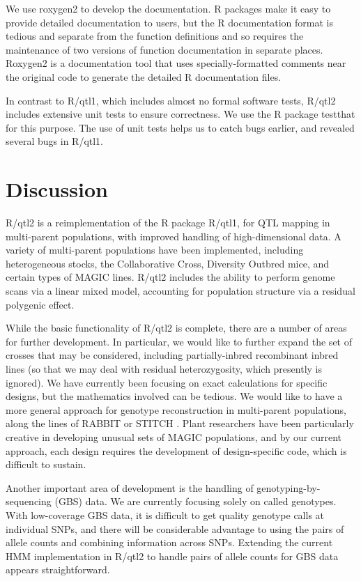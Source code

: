 \documentclass[12pt,letterpaper]{article}
\begin{document}
We use roxygen2 \citep{roxygen2} to develop the documentation. R
packages make it easy to provide detailed documentation to users, but
the R documentation format is tedious and separate from the function
definitions and so requires the maintenance of two versions of
function documentation in separate places. Roxygen2 is a documentation
tool that uses specially-formatted comments near the original code to
generate the detailed R documentation files.

In contrast to R/qtl1, which includes almost no formal software tests,
R/qtl2 includes extensive unit tests to ensure correctness. We use the
R package testthat \citep{testthat} for this purpose. The use of unit
tests helps us to catch bugs earlier, and revealed several bugs in
R/qtl1.




\clearpage
\section*{Discussion}

R/qtl2 is a reimplementation of the R package R/qtl1, for QTL mapping
in multi-parent populations, with improved handling of
high-dimensional data. A variety of multi-parent populations have been
implemented, including heterogeneous stocks, the Collaborative Cross,
Diversity Outbred mice, and certain types of MAGIC lines. R/qtl2
includes the ability to perform genome scans via a linear mixed model,
accounting for population structure via a residual polygenic effect.

While the basic functionality of R/qtl2 is complete, there are a
number of areas for further development. In particular, we would like
to further expand the set of crosses that may be considered, including
partially-inbred recombinant inbred lines (so that we may deal with
residual heterozygosity, which presently is ignored). We have currently
been focusing on exact calculations for specific designs, but the
mathematics involved can be tedious. We would like to have a more
general approach for genotype reconstruction in multi-parent
populations, along the lines of RABBIT \citep{zheng2015} or STITCH
\citep{davies2016}. Plant researchers have been particularly creative
in developing unusual sets of MAGIC populations, and by our current
approach, each design requires the development of design-specific
code, which is difficult to sustain.

Another important area of development is the handling of
genotyping-by-sequencing (GBS) data. We are currently focusing solely
on called genotypes. With low-coverage GBS data, it is difficult
to get quality genotype calls at individual SNPs, and there will be
considerable advantage to using the pairs of allele counts and
combining information across SNPs. Extending the current HMM
implementation in R/qtl2 to handle pairs of allele counts for GBS data
appears straightforward.
\end{document}
